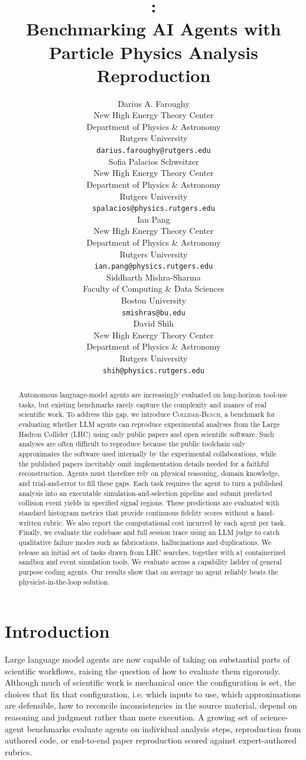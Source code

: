 \documentclass{article}
\title{\ColliderBench{}:\\ Benchmarking AI Agents with Particle Physics Analysis Reproduction}
\author{
  Darius A. Faroughy \\
  New High Energy Theory Center \\
  Department of Physics \& Astronomy\\
  Rutgers University\\
  \texttt{darius.faroughy@rutgers.edu} \\
  \And
  Sofia Palacios Schweitzer \\
  New High Energy Theory Center \\
  Department of Physics \& Astronomy\\
  Rutgers University \\
  \texttt{spalacios@physics.rutgers.edu} \\
  \And
  Ian Pang \\
  New High Energy Theory Center \\
  Department of Physics \& Astronomy\\
  Rutgers University \\
  \texttt{ian.pang@physics.rutgers.edu} \\
  \And
  Siddharth Mishra-Sharma \\
  Faculty of Computing \& Data Sciences \\ 
  Boston University \\
  \texttt{smishras@bu.edu} \\
  \And
  David Shih \\
  New High Energy Theory Center \\
  Department of Physics \& Astronomy\\
  Rutgers University \\
  \texttt{shih@physics.rutgers.edu} \\
}
\newcommand{\ColliderBench}{\textsc{Collider-Bench}}
\begin{document}
\maketitle

\begin{abstract}
Autonomous language-model agents are increasingly evaluated on long-horizon tool-use tasks, but existing benchmarks rarely capture the complexity and nuance of real scientific work. To address this gap, we introduce \ColliderBench{}, a benchmark for evaluating whether LLM agents can reproduce experimental analyses from the Large Hadron Collider (LHC) using only public papers and open scientific software. Such analyses are often difficult to reproduce because the public toolchain only approximates the software used internally by the experimental collaborations, while the published papers inevitably omit implementation details needed for a faithful reconstruction. Agents must therefore rely on physical reasoning, domain knowledge, and trial-and-error to fill these gaps. Each task requires the agent to turn a published analysis into an executable simulation-and-selection pipeline and submit predicted collision event yields in specified signal regions. These predictions are evaluated with standard histogram metrics that provide continuous fidelity scores without a hand-written rubric. We also report the computational cost incurred by each agent per task. Finally, we evaluate the codebase and full session trace using an LLM judge to catch qualitative failure modes such as fabrications, hallucinations and duplications. We release an initial set of tasks drawn from LHC searches, together with a† containerized sandbox and event simulation tools. We evaluate across a capability ladder of general purpose coding agents. Our results show that on average no agent reliably beats the physicist-in-the-loop solution.\\ 
\end{abstract}

\section{Introduction}
\label{sec:intro}

Large language model agents are now capable of taking on substantial parts of scientific workflows, raising the question of how to evaluate them rigorously. Although much of scientific work is mechanical once the configuration is set, the choices that fix that configuration, i.e. which inputs to use, which approximations are defensible, how to reconcile inconsistencies in the source material, depend on reasoning and judgment rather than mere execution. A growing set of science-agent benchmarks evaluate agents on individual analysis steps, reproduction from authored code, or end-to-end paper reproduction scored against expert-authored rubrics.
\end{document}
